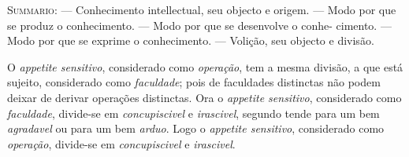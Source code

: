 {\small\noindent\textsc{Summario}: --- Conhecimento intellectual, seu objecto e origem. --- Modo por que se produz o conhecimento. --- Modo por que se desenvolve o conhe- cimento. --- Modo por que se exprime o conhecimento. --- Volição, seu objecto e divisão.\par}


 
O \emph{appetite sensitivo}, considerado como \emph{operação}, tem a mesma divisão, a que está sujeito, considerado como \emph{faculdade}; pois de faculdades distinctas não podem deixar de derivar operações distinctas. Ora o \emph{appetite sensitivo}, considerado como \emph{faculdade}, divide-se em \emph{concupiscivel} e \emph{irascivel}, segundo tende para um bem \emph{agradavel} ou para um bem \emph{arduo}. Logo o \emph{appetite sensitivo}, considerado como \emph{operação}, divide-se em \emph{concupiscivel} e \emph{irascivel}.


